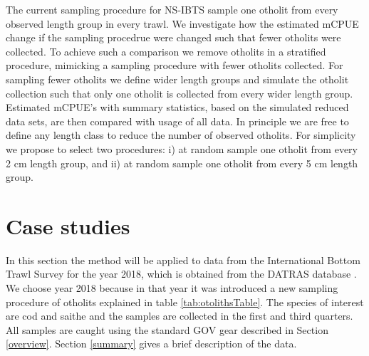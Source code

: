\documentclass[a4paper 12pt]{article}
\numberwithin{equation}{section}
\begin{document}



The current sampling procedure for NS-IBTS sample one otholit from every observed length group in every trawl. We investigate how the estimated mCPUE change if the sampling procedrue were changed such that fewer otholits were collected. To achieve such a comparison we remove otholits in a stratified procedure, mimicking a sampling procedure with fewer otholits collected. For sampling fewer otholits we define wider length groups and simulate the otholit collection such that only one otholit is collected from every wider length group. Estimated mCPUE's with summary statistics, based on the simulated reduced data sets, are then compared with usage of all data. In principle we are free to define any length class to reduce the number of observed otholits. For simplicity we propose to select two procedures: i) at random sample one otholit from every 2 cm length group, and ii) at random sample one otholit from every 5 cm length group. 

\section{Case studies}
\label{sec:data}
In this section the method will be applied to data from the International Bottom Trawl Survey for the year 2018, which is obtained from the DATRAS database \citep{datras}. We choose year 2018 because in that year it was introduced a new sampling procedure of otholits explained in table \ref{tab:otolithsTable}.  The species of interest are cod and saithe and the samples are collected in the first and third quarters. All samples are caught using the standard GOV gear described in Section \ref{overview}. Section \ref{summary} gives a brief description of the data. \\
\end{document}
